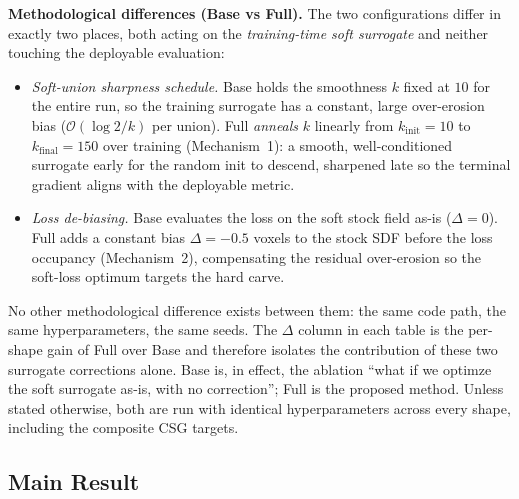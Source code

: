 \textbf{Methodological differences (Base vs Full).} The two configurations differ
in exactly two places, both acting on the \emph{training-time soft surrogate} and
neither touching the deployable evaluation:
\begin{itemize}\itemsep0pt
  \item \emph{Soft-union sharpness schedule.} Base holds the smoothness $k$ fixed
        at $10$ for the entire run, so the training surrogate has a constant,
        large over-erosion bias ($\mathcal{O}(\log 2 / k)$ per union). Full
        \emph{anneals} $k$ linearly from $k_{\mathrm{init}}{=}10$ to
        $k_{\mathrm{final}}{=}150$ over training (Mechanism~1): a smooth,
        well-conditioned surrogate early for the random init to descend, sharpened
        late so the terminal gradient aligns with the deployable metric.
  \item \emph{Loss de-biasing.} Base evaluates the loss on the soft stock field
        as-is ($\Delta{=}0$). Full adds a constant bias $\Delta{=}-0.5$ voxels to
        the stock SDF before the loss occupancy (Mechanism~2), compensating the
        residual over-erosion so the soft-loss optimum targets the hard carve.
\end{itemize}
No other methodological difference exists between them: the same code path, the
same hyperparameters, the same seeds. The $\Delta$ column in each table is the
per-shape gain of Full over Base and therefore isolates the contribution of these
two surrogate corrections alone. Base is, in effect, the ablation ``what if we
optimze the soft surrogate as-is, with no correction''; Full is the proposed
method. Unless stated otherwise, both are run with identical hyperparameters
across every shape, including the composite CSG targets.

\subsection{Main Result}
\label{sec:main-result}

